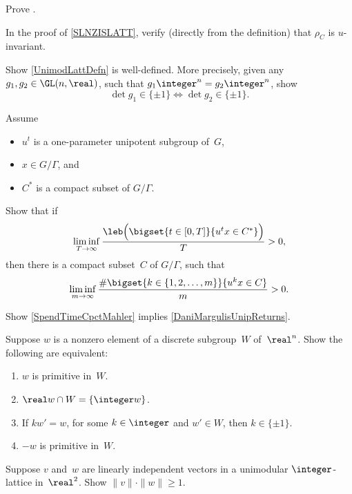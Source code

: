 \begin{exercises}
\item \label{rhoC>0Ex}
Prove .

\item \label{rhoCinvtEx}
In the proof of \cref{SLNZISLATT}, verify (directly from the definition) that $\rho_C$ is $u$-invariant.

\item \label{UnimodLattDefnWellDef}
Show \cref{UnimodLattDefn} is well-defined. More precisely, given any $g_1 , g_2 \in \GL(n,\real)$, such that $g_1 \integer^n = g_2 \integer^n$, show 
	$$ \det g_1 \in \{ \pm1\}  \iff \det g_2 \in \{ \pm 1\} .$$

\item \label{DiscToContInCpct}
Assume 
	\begin{itemize}
	\item $u^t$ is a one-parameter unipotent subgroup of~$G$, 
	\item $x \in G/\Gamma$,
	and
	\item $C^*$ is a compact subset of $G/\Gamma$.
	\end{itemize}
Show that if 
	$$ \liminf_{T \to \infty} \frac{\leb \Bigl( \bigset{ t \in [0,T] }{  u^t x \in C^* } \Bigr)}{T} > 0 , $$
then there is a compact subset~$C$ of $G/\Gamma$, such that 
	$$ \liminf_{m \to \infty} \frac{\# \bigset{ k \in \{1,2,\ldots,m\} }{ u^k x \in C} }{m} > 0 .$$

\item \label{SpendTimeCpctMahlerEx}
Show \cref{SpendTimeCpctMahler} implies \cref{DaniMargulisUnipReturns}.

\item \label{PrimVecIffEx}
Suppose $w$ is a nonzero element of a discrete subgroup~$W$ of~$\real^n$. Show the following are equivalent:
	\begin{enumerate}
	\item $w$ is primitive in~$W$.
	\item $\real w \cap  W = \{\integer w\}$.
	\item If $kw' = w$, for some $k \in \integer$ and $w' \in W$, then $k \in \{\pm 1\}$.
	\item \label{PrimVecIffEx-minus}
	$-w$ is primitive in~$W$.
	\end{enumerate}

\item \label{UnimodNot2Short}
Suppose $v$ and~$w$ are linearly independent vectors in a unimodular $\integer$-lattice in~$\real^2$. Show $\| v \| \cdot \|w \| \ge 1$.


\end{exercises}
